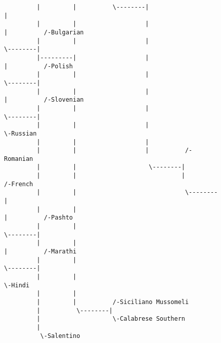 \begin{figure}[!htb]
\begin{center}
{\begin{verbatim}
         |         |          \--------|                   |
         |         |                   |                   |          /-Bulgarian
         |         |                   |                    \--------|
         |---------|                   |                             |          /-Polish
         |         |                   |                              \--------|
         |         |                   |                                       |          /-Slovenian
         |         |                   |                                        \--------|
         |         |                   |                                                  \-Russian
         |         |                   |
         |         |                   |          /-Romanian
         |         |                    \--------|
         |         |                             |          /-French
         |         |                              \--------|
         |         |                                       |          /-Pashto
         |         |                                        \--------|
         |         |                                                 |          /-Marathi
         |         |                                                  \--------|
         |         |                                                            \-Hindi
         |         |
         |         |          /-Siciliano Mussomeli
         |          \--------|
         |                    \-Calabrese Southern
         |
          \-Salentino

\end{verbatim}
}
\label{...}
\end{center}
\end{figure}
